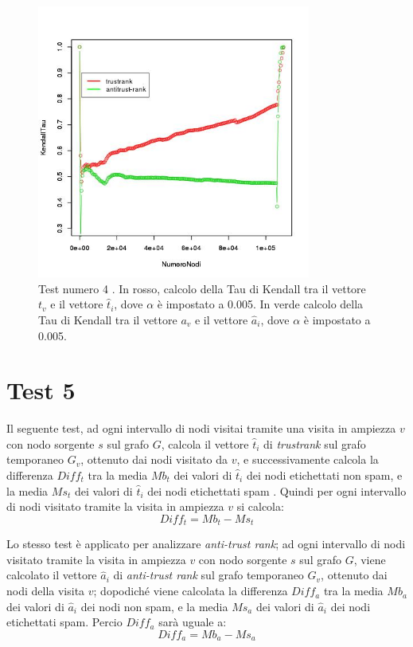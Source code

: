 \begin{figure}
 \centering
 \includegraphics[height=9cm]{immagini/test4/coplotTrustAnti_Mode1_set3776_62_alpha0005}
  \caption{Test numero 4 . In rosso, calcolo della Tau di Kendall tra il vettore $t_v$ e il vettore $\hat{t}_i$, dove $\alpha$ è impostato a 0.005. In verde calcolo della Tau di Kendall tra il vettore $a_v$ e il vettore $\hat{a}_i$, dove $\alpha$ è impostato a 0.005.}
 \label{fig:test4coplotTrustAntiModeB620005}
\end{figure}


\section{Test 5}
Il seguente test, ad ogni intervallo di nodi visitai tramite una visita in ampiezza \(v\)  con nodo sorgente \(s\) sul grafo \(G\), calcola il vettore \(\hat{t}_i\) di \textit{trustrank}  sul grafo temporaneo \(G_v\), ottenuto dai nodi visitato da \(v\), e successivamente calcola la differenza \(Diff_t\) tra la media \(Mb_t\) dei valori di \(\hat{t}_i\) dei nodi etichettati non spam, e la media \(Ms_t\) dei valori di \(\hat{t}_i\) dei nodi etichettati spam . Quindi per ogni intervallo di nodi visitato tramite la visita in ampiezza \(v\) si calcola:
\begin{equation}
 Diff_t = Mb_t-Ms_t
\end{equation}

Lo stesso test è applicato per analizzare \textit{anti-trust rank}; ad ogni intervallo di nodi visitato  tramite la visita in ampiezza \(v\) con nodo sorgente \(s\) sul grafo \(G\), viene calcolato il vettore \(\hat{a}_i\)  di \textit{anti-trust rank}  sul grafo temporaneo \(G_v\), ottenuto dai nodi della visita \(v\);  dopodiché viene calcolata la differenza \(Diff_a\) tra la media \(Mb_a\) dei valori di \(\hat{a}_i\) dei nodi non spam, e la media \(Ms_a\) dei valori di \(\hat{a}_i\) dei nodi etichettati spam. Percio \(Diff_a\) sarà uguale a:
\begin{equation}
 Diff_a=Mb_a-Ms_a
\end{equation}


